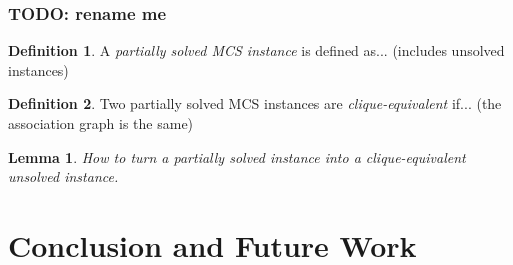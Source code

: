 \documentclass{l4proj}
\newtheorem{lemma}{Lemma}[chapter]
\theoremstyle{definition}
\newtheorem{definition}{Definition}[chapter]
\theoremstyle{remark}
\begin{document}
\subsection{TODO: rename me}

\begin{definition}
  A \emph{partially solved MCS instance} is defined as... (includes unsolved
  instances)
\end{definition}

\begin{definition}
  Two partially solved MCS instances are \emph{clique-equivalent} if... (the
  association graph is the same)
\end{definition}

\begin{lemma}
  How to turn a partially solved instance into a clique-equivalent unsolved
  instance.
\end{lemma}

\chapter{Conclusion and Future Work}

\end{document}
